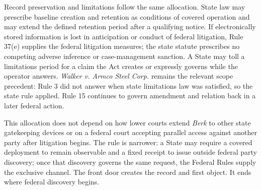 Record preservation and limitations follow the same allocation. State law may prescribe baseline creation and retention as conditions of covered operation and may extend the defined retention period after a qualifying notice. If electronically stored information is lost in anticipation or conduct of federal litigation, Rule 37(e) supplies the federal litigation measures; the state statute prescribes no competing adverse inference or case-management sanction. A State may toll a limitations period for a claim the Act creates or expressly governs while the operator answers. \emph{Walker v. Armco Steel Corp.} remains the relevant scope precedent: Rule 3 did not answer when state limitations law was satisfied, so the state rule applied. Rule 15 continues to govern amendment and relation back in a later federal action.

This allocation does not depend on how lower courts extend \emph{Berk} to other state gatekeeping devices or on a federal court accepting parallel access against another party after litigation begins. The rule is narrower: a State may require a covered deployment to remain observable and a fixed receipt to issue outside federal party discovery; once that discovery governs the same request, the Federal Rules supply the exclusive channel. The front door creates the record and first object. It ends where federal discovery begins.
